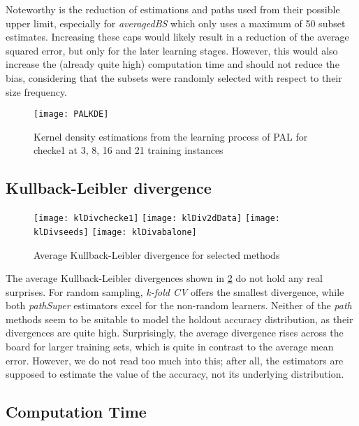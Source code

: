 Noteworthy is the reduction of estimations and paths used from their possible upper limit, especially for \textit{averagedBS} which only uses a maximum of 50 subset estimates. Increasing these caps would likely result in a reduction of the average squared error, but only for the later learning stages. However, this would also increase the (already quite high) computation time and should not reduce the bias, considering that the subsets were randomly selected with respect to their size frequency.

\begin{figure}[h]
	\centering
	\texttt{[image: PALKDE]}
	\caption{Kernel density estimations from the learning process of PAL for checke1 at 3, 8, 16 and 21 training instances}
	\label{fig:PALKDEs}
\end{figure}

\subsection{Kullback-Leibler divergence}

\begin{figure}[h]
	\centering
	\texttt{[image: klDivchecke1]}
	\texttt{[image: klDiv2dData]}
	\texttt{[image: klDivseeds]}
	\texttt{[image: klDivabalone]}
	\caption{Average Kullback-Leibler divergence for selected methods}
	\label{fig:klDiv}
\end{figure}

The average Kullback-Leibler divergences shown in \ref{fig:klDiv} do not hold any real surprises. For random sampling, \textit{k-fold CV} offers the smallest divergence, while both \textit{pathSuper} estimators excel for the non-random learners. Neither of the \textit{path} methods seem to be suitable to model the holdout accuracy distribution, as their divergences are quite high. Surprisingly, the average divergence rises across the board for larger training sets, which is quite in contrast to the average mean error. However, we do not read too much into this; after all, the estimators are supposed to estimate the value of the accuracy, not its underlying distribution.

\subsection{Computation Time}

